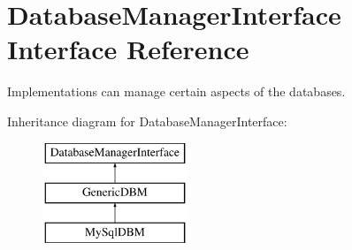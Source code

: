 \hypertarget{interfaceDatabaseManagerInterface}{\section{Database\-Manager\-Interface Interface Reference}
\label{interfaceDatabaseManagerInterface}
}


Implementations can manage certain aspects of the databases.  


Inheritance diagram for Database\-Manager\-Interface\-:\begin{figure}[H]
\begin{center}
\leavevmode
\includegraphics[height=3.000000cm]{interfaceDatabaseManagerInterface}
\end{center}
\end{figure}
